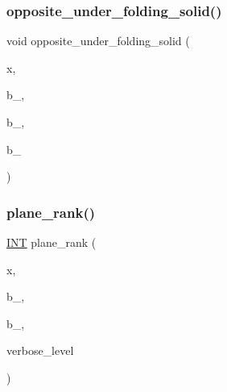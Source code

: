 \mbox{\label{hamming_8_c_a362251ba8decbf55f4d6cddcde116c7a}} 
\subsubsection{\texorpdfstring{opposite\+\_\+under\+\_\+folding\+\_\+solid()}{opposite\_under\_folding\_solid()}}
{\footnotesize\ttfamily void opposite\+\_\+under\+\_\+folding\+\_\+solid (\begin{DoxyParamCaption}\item[{\mbox{\hyperlink{galois_8h_a09fddde158a3a20bd2dcadb609de11dc}{I\+NT}} $\ast$}]{x,  }\item[{\mbox{\hyperlink{galois_8h_a09fddde158a3a20bd2dcadb609de11dc}{I\+NT}}}]{b\+\_,  }\item[{\mbox{\hyperlink{galois_8h_a09fddde158a3a20bd2dcadb609de11dc}{I\+NT}}}]{b\+\_,  }\item[{\mbox{\hyperlink{galois_8h_a09fddde158a3a20bd2dcadb609de11dc}{I\+NT}}}]{b\+\_ }\end{DoxyParamCaption})}

\mbox{\label{hamming_8_c_acfecf66be342ea15d6ee6117385e506e}} 
\subsubsection{\texorpdfstring{plane\+\_\+rank()}{plane\_rank()}}
{\footnotesize\ttfamily \mbox{\hyperlink{galois_8h_a09fddde158a3a20bd2dcadb609de11dc}{I\+NT}} plane\+\_\+rank (\begin{DoxyParamCaption}\item[{\mbox{\hyperlink{galois_8h_a09fddde158a3a20bd2dcadb609de11dc}{I\+NT}} $\ast$}]{x,  }\item[{\mbox{\hyperlink{galois_8h_a09fddde158a3a20bd2dcadb609de11dc}{I\+NT}}}]{b\+\_,  }\item[{\mbox{\hyperlink{galois_8h_a09fddde158a3a20bd2dcadb609de11dc}{I\+NT}}}]{b\+\_,  }\item[{\mbox{\hyperlink{galois_8h_a09fddde158a3a20bd2dcadb609de11dc}{I\+NT}}}]{verbose\+\_\+level }\end{DoxyParamCaption})}


